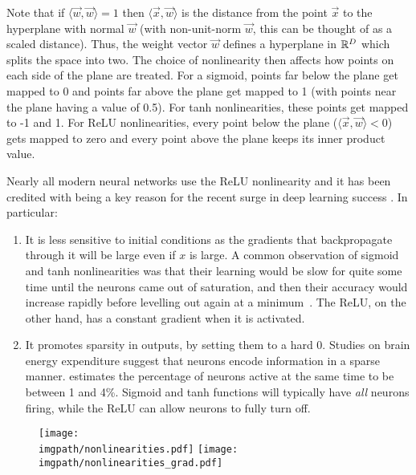 Note that if $\langle\vec{w}, \vec{w}\rangle = 1$ then $\langle\vec{x},
\vec{w}\rangle$ is the distance from the point $\vec{x}$ to the hyperplane with
normal $\vec{w}$ (with non-unit-norm $\vec{w}$, this can be thought of as a scaled
distance). Thus, the weight vector $\vec{w}$ defines a hyperplane in $\reals[D]$
which splits the space into two. The choice of nonlinearity then affects how
points on each side of the plane are treated. For a sigmoid, points far below
the plane get mapped to 0 and points far above the plane get mapped to 1 (with
points near the plane having a value of 0.5). For tanh nonlinearities, these
points get mapped to -1 and 1. For ReLU nonlinearities, every point below the
plane ($\langle\vec{x}, \vec{w}\rangle < 0$) gets mapped to zero and every point
above the plane keeps its inner product value.

Nearly all modern neural networks use the ReLU nonlinearity and it has
been credited with being a key reason for the recent surge in deep learning
success \cite{glorot_deep_2011, nair_rectified_2010}. In particular:
\begin{enumerate}
\item It is less sensitive to initial conditions as the gradients that
  backpropagate through it will be large even if $x$ is large. A common
  observation of sigmoid and tanh nonlinearities was that their learning would
  be slow for quite some time until the neurons came out of saturation, and then
  their accuracy would increase rapidly before levelling out again at
  a minimum~\cite{glorot_understanding_2010}. The ReLU, on the other hand, has
  a constant gradient when it is activated.
\item It promotes sparsity in outputs, by setting them to a hard 0. Studies
  on brain energy expenditure suggest that neurons encode information in
  a sparse manner. \cite{lennie_cost_2003} estimates the percentage of
  neurons active at the same time to be between 1 and 4\%. Sigmoid and tanh
  functions will typically have \emph{all} neurons firing, while
  the ReLU can allow neurons to fully turn off.
\end{enumerate}

\begin{figure}
    \qquad
    \texttt{[image: \\imgpath/nonlinearities.pdf]}
    \quad
    \texttt{[image: \\imgpath/nonlinearities\_grad.pdf]}
  \centering
  \label{fig:ch2:nonlinearities}
\end{figure}

